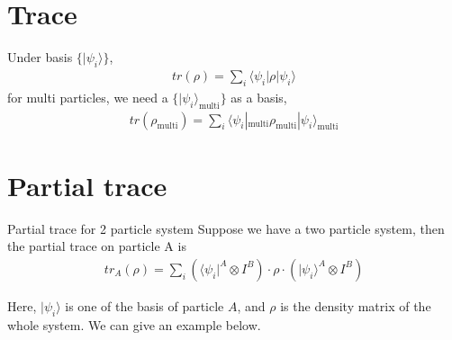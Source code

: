 \documentclass[UTF8,12pt]{article} %
\numberwithin{equation}{section}
\begin{document}
\section{Trace}

Under basis $\{|\psi_{i}\rangle\}$,
\begin{align}
tr(\rho) = \sum_{i}\langle\psi_{i}|\rho|\psi_{i}\rangle
\end{align}
for multi particles, we need a $\{|\psi_{i}\rangle_{\text{multi}}\}$ as a basis,
\begin{align}
tr(\rho_{\text{multi}}) = \sum_{i}\langle\psi_{i}|_{\text{multi}}\rho_{\text{multi}}|\psi_{i}\rangle_{\text{multi}}
\end{align}

\section{Partial trace}

\begin{definition}{Partial trace for 2 particle system}{}\label{pt2}
Suppose we have a two particle system, then the partial trace on particle A is
\begin{align}
tr_{A}(\rho) = \sum_{i} \left(\langle\psi_{i}|^{A} \otimes I^{B}\right) \cdot \rho \cdot \left(|\psi_{i}\rangle^{A} \otimes I^{B}\right)
\end{align}
\end{definition}

Here, $|\psi_{i}\rangle$ is one of the basis of particle $A$, and $\rho$ is the density matrix of the whole system. We can give an example below.
\end{document}
